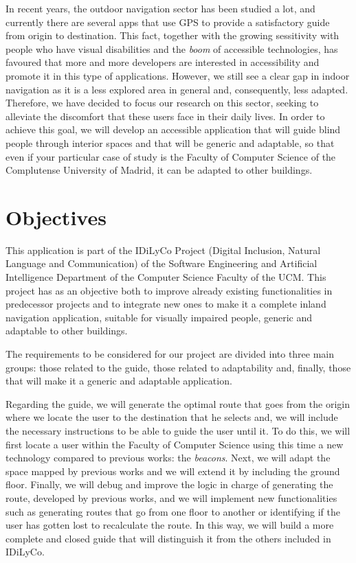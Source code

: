 In recent years, the outdoor navigation sector has been studied a lot, and currently there are several apps that use GPS to provide a satisfactory guide from origin to destination. This fact, together with the growing sessitivity with people who have visual disabilities and the \textit{boom} of accessible technologies, has favoured that more and more developers are interested in accessibility and promote it in this type of applications. However, we still see a clear gap in indoor navigation as it is a less explored area in general and, consequently, less adapted. Therefore, we have decided to focus our research on this sector, seeking to alleviate the discomfort that these users face in their daily lives. In order to achieve this goal, we will develop an accessible application that will guide blind people through interior spaces and that will be generic and adaptable, so that even if your particular case of study is the Faculty of Computer Science of the Complutense University of Madrid, it can be adapted to other buildings. 


\section{Objectives}
This application is part of the IDiLyCo Project (Digital Inclusion, Natural Language and Communication) of the
Software Engineering and Artificial Intelligence Department of the Computer Science Faculty of the UCM. This project has
as an objective both to improve already existing functionalities in predecessor projects and to integrate new ones to make it a complete inland navigation application, suitable for visually impaired people, generic and adaptable to other buildings.

The requirements to be considered for our project are divided into three main groups: those related to the guide, those related to adaptability and, finally, those that will make it a generic and adaptable application.

Regarding the guide, we will generate the optimal route that goes from the origin where we locate the user to the destination that he selects and, we will include the necessary instructions to be able to guide the user until it. To do this, we will first locate a user within the Faculty of Computer Science using this time a new technology compared to previous works: the \textit{beacons}. Next, we will adapt the space mapped by previous works and we will extend it by including the ground floor. Finally, we will debug and improve the logic in charge of generating the route, developed by previous works, and we will implement new functionalities such as generating routes that go from one floor to another or identifying if the user has gotten lost to recalculate the route. In this way, we will build a more complete and closed guide that will distinguish it from the others included in IDiLyCo.

